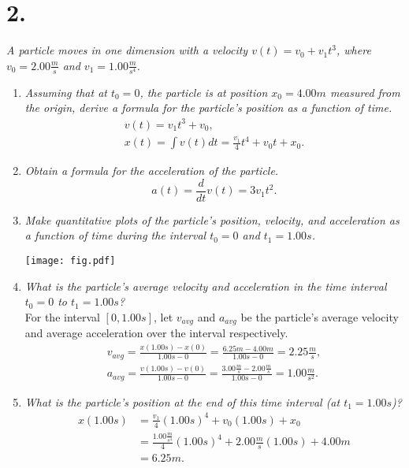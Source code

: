 \documentclass[12pt]{article}
\begin{document}
\section*{2.}
\textit{A particle moves in one dimension with a velocity
$v(t) = v_0 + v_1 t^3$, where $v_0 = 2.00\si{\frac{m}{s}}$ and
$v_1 = 1.00\si{\frac{m}{s^4}}$.}
\begin{enumerate}[label=(\alph*)]
	\item \textit{Assuming that at $t_0 = 0$, the particle is at position
	$x_0 = 4.00\si{m}$ measured from the origin, derive a formula for the
	particle's position as a function of time.}
	\begin{gather*}
		v(t) = v_1 t^3 + v_0, \\
		x(t)
		= \int v(t) dt
		= \boxed{
			\frac{v_1}{4}t^4 + v_0 t + x_0
		}.
	\end{gather*}
	\item \textit{Obtain a formula for the acceleration of the particle.}
	\begin{equation*}
		a(t)
		= \frac{d}{dt} v(t)
		= \boxed{
			3v_1 t^2
		}.
	\end{equation*}
	\item \textit{Make quantitative plots of the particle's position,
	velocity, and acceleration as a function of time during the interval
	$t_0 = 0$ and $t_1 = 1.00\si{s}$.}
	\begin{center}
		\texttt{[image: fig.pdf]}
	\end{center}
	\newpage
	\item \textit{What is the particle's average velocity and acceleration in
	the time interval $t_0 = 0$ to $t_1 = 1.00\si{s}$?} \\[\baselineskip]
	For the interval $[0, 1.00\si{s}]$, let $v_{avg}$ and $a_{avg}$ be the
	particle's average velocity and average acceleration over the interval
	respectively.
	\begin{gather*}
		v_{avg}
		= \frac{x(1.00\si{s}) - x(0)}{1.00\si{s} - 0}
		= \frac{6.25\si{m} - 4.00\si{m}}{1.00\si{s} - 0}
		= \boxed{2.25\si{\frac{m}{s}}}, \\
		a_{avg}
		= \frac{v(1.00\si{s}) - v(0)}{1.00\si{s} - 0}
		= \frac{3.00\si{\frac{m}{s}} - 2.00\si{\frac{m}{s}}}{1.00\si{s} - 0}
		= \boxed{1.00\si{\frac{m}{s^2}}}.
	\end{gather*}
	\item \textit{What is the particle's position at the end of this time
	interval (at $t_1 = 1.00\si{s}$)?}
	\begin{align*}
		x(1.00\si{s})
		&= \frac{v_1}{4}(1.00\si{s})^4 + v_0 (1.00\si{s}) + x_0 \\
		&= {
			\frac{1.00\si{\frac{m}{s^4}}}{4}(1.00\si{s})^4
			+ 2.00\si{\frac{m}{s}} (1.00\si{s})
			+ 4.00\si{m}
		} \\
		&= \boxed{6.25\si{m}}
		.
	\end{align*}
\end{enumerate}
\end{document}
